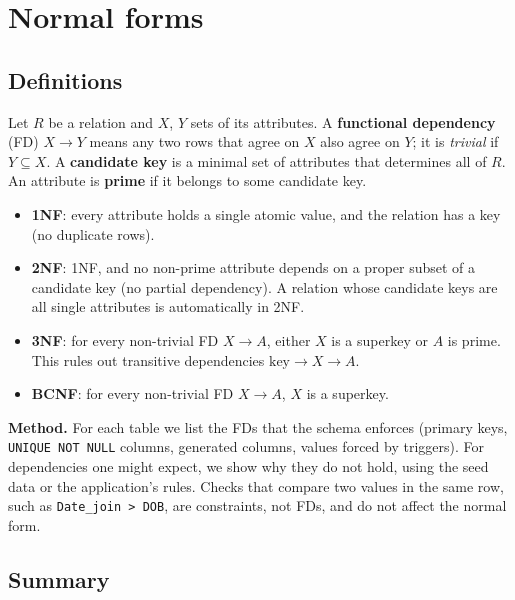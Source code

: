\documentclass[11pt,a4paper]{article}
\newcommand{\code}[1]{\texttt{#1}}
\begin{document}
\section{Normal forms}

\subsection{Definitions}

Let $R$ be a relation and $X$, $Y$ sets of its attributes. A \textbf{functional dependency} (FD) $X \rightarrow Y$ means any two rows that agree on $X$ also agree on $Y$; it is \emph{trivial} if $Y \subseteq X$. A \textbf{candidate key} is a minimal set of attributes that determines all of $R$. An attribute is \textbf{prime} if it belongs to some candidate key.

\begin{itemize}
  \item \textbf{1NF}: every attribute holds a single atomic value, and the relation has a key (no duplicate rows).
  \item \textbf{2NF}: 1NF, and no non-prime attribute depends on a proper subset of a candidate key (no partial dependency). A relation whose candidate keys are all single attributes is automatically in 2NF.
  \item \textbf{3NF}: for every non-trivial FD $X \rightarrow A$, either $X$ is a superkey or $A$ is prime. This rules out transitive dependencies $\text{key} \rightarrow X \rightarrow A$.
  \item \textbf{BCNF}: for every non-trivial FD $X \rightarrow A$, $X$ is a superkey.
\end{itemize}

\textbf{Method.} For each table we list the FDs that the schema enforces (primary keys, \code{UNIQUE NOT NULL} columns, generated columns, values forced by triggers). For dependencies one might expect, we show why they do not hold, using the seed data or the application's rules. Checks that compare two values in the same row, such as \code{Date\_join > DOB}, are constraints, not FDs, and do not affect the normal form.

\subsection{Summary}
\end{document}
